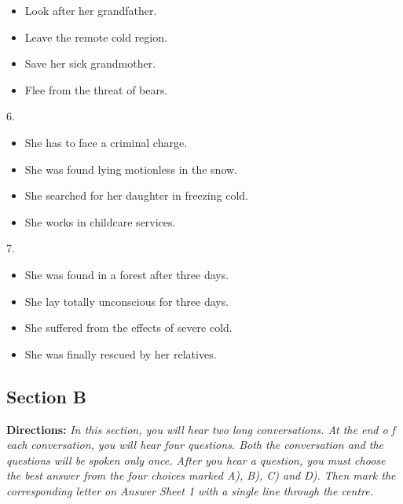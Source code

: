 \documentclass[UTF8,11pt]{ctexart}
\begin{document}
\begin{itemize}[leftmargin=2em,itemsep=.2em,topsep=.4em]\item[A.] Look after her grandfather.
\item[B.] Leave the remote cold region.
\item[C.] Save her sick grandmother.
\item[D.] Flee from the threat of bears.
\end{itemize}

6.


\begin{itemize}[leftmargin=2em,itemsep=.2em,topsep=.4em]\item[A.] She has to face a criminal charge.
\item[B.] She was found lying motionless in the snow.
\item[C.] She searched for her daughter in freezing cold.
\end{itemize}

\begin{itemize}[leftmargin=2em,itemsep=.2em,topsep=.4em]\item[D.] She works in childcare services.
\end{itemize}

7.


\begin{itemize}[leftmargin=2em,itemsep=.2em,topsep=.4em]\item[A.] She was found in a forest after three days.
\item[B.] She lay totally unconscious for three days.
\item[C.] She suffered from the effects of severe cold.
\item[D.] She was finally rescued by her relatives.
\end{itemize}

\subsection*{\textbf{Section B}}


\textbf{Directions: }\textit{In this section, you will hear two long conversations. At the end o f each} \textit{conversation, you will hear four questions. Both the conversation and the questions will be} \textit{spoken only once. After you hear a question, you must choose the best answer from the four} \textit{choices marked A), B), C) and D). Then mark the corresponding letter on Answer Sheet 1 with} \textit{a single line through the centre.}
\end{document}
